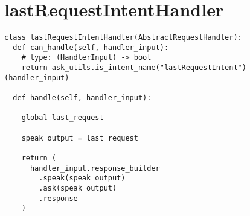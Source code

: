 
\section{lastRequestIntentHandler}
\label{A14Anexo}

\begin{tcolorbox}[colback=white!25!white,colframe=blue]
  \begin{verbatim}
class lastRequestIntentHandler(AbstractRequestHandler):
  def can_handle(self, handler_input):
    # type: (HandlerInput) -> bool
    return ask_utils.is_intent_name("lastRequestIntent")(handler_input)

  def handle(self, handler_input):
        
    global last_request
        
    speak_output = last_request
                
    return (
      handler_input.response_builder
        .speak(speak_output)
        .ask(speak_output)
        .response
    )

  \end{verbatim}
\end{tcolorbox}